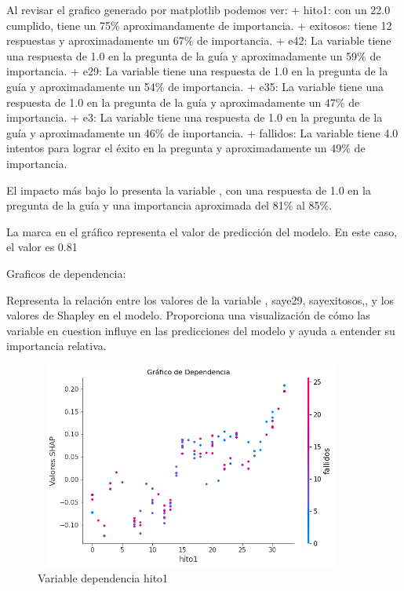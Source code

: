 Al revisar el grafico generado por matplotlib podemos ver:
+ hito1: con un 22.0 cumplido, tiene un 75\%  aproximandamente de importancia.
+ exitosos: tiene 12 respuestas y aproximadamente un 67\% de importancia.
+ e42: La variable tiene una respuesta de 1.0 en la pregunta de la guía y aproximadamente un 59\% de importancia.
+ e29: La variable tiene una respuesta de 1.0 en la pregunta de la guía y aproximadamente un 54\% de importancia.
+ e35: La variable tiene una respuesta de 1.0 en la pregunta de la guía y aproximadamente un 47\% de importancia.
+ e3: La variable tiene una respuesta de 1.0 en la pregunta de la guía y aproximadamente un 46\% de importancia.
+ fallidos: La variable tiene 4.0 intentos para lograr el éxito en la pregunta y aproximadamente un 49\% de importancia.

El impacto más bajo lo presenta la variable , con una respuesta de 1.0 en la pregunta de la guía y una importancia aproximada del 81\% al 85\%.

La marca  en el gráfico representa el valor de predicción del modelo. En este caso, el valor es 0.81

Graficos de dependencia:

Representa la relación entre los valores de la variable , say{e29}, say{exitosos},,  y los valores de Shapley en el modelo. Proporciona una visualización de cómo las variable en cuestion influye en las predicciones del modelo y ayuda a entender su importancia relativa.

\begin{figure}[H]
    \centering
    \includegraphics[width=4.0611in,height=2.6861in]{img/shap_rf/hito1.png}
    \caption{Variable dependencia hito1}
    \label{fig:dependencia_hito1}
\end{figure}

